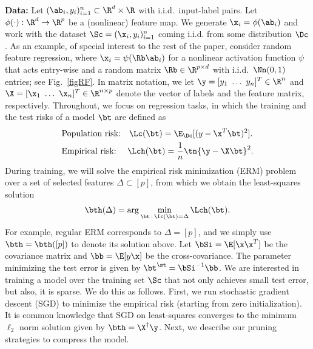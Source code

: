 \vp
\noindent \textbf{Data:} Let $(\ab_i,y_i)_{i=1}^n\subset \R^d\times \R$ with i.i.d.~input-label pairs. Let $\phi(\cdot):\R^d\rightarrow\R^p$ be a (nonlinear) feature map. We generate $\x_i=\phi(\ab_i)$ and work with the dataset $\Sc=(\x_i,y_i)_{i=1}^n$ coming i.i.d. from some distribution $\Dc$. As an example, of special interest to the rest of the paper, consider random feature regression, where $\x_i=\psi(\Rb\ab_i)$ for a nonlinear activation function $\psi$ that acts entry-wise and a random matrix $\Rb\in \R^{p\times d}$ with i.i.d.~$\Nn(0,1)$ entries; see Fig.~\ref{figRF}. In matrix notation, we let $\y=[y_1~\dots~y_n]^T\in\R^n$ and $\X=[\x_1~\dots~\x_n]^T\in\R^{n\times p}$ denote the vector of labels and the feature matrix, respectively.
Throughout, we focus on regression tasks, in which the training and the test risks of a model $\bt$ are defined as%
\begin{align}
&\text{Population risk:}~~~\Lc(\bt)=\E_{\Dc}[(y-\x^T\bt)^2].\label{test formula}\\
&\text{Empirical risk:}~~~~\Lch(\bt)=\frac{1}{n}\tn{\y-\X\bt}^2.\label{erm}
\end{align}
During training, we will solve the empirical risk minimization (ERM) problem over a set of selected features $\Delta\subset[p]$, from which we obtain the least-squares solution
\begin{align}
\label{eq:ERM}
\bth(\Delta)=\arg\min_{\bt\,:\,\Ic(\bt)=\Delta} \Lch(\bt).
\end{align}
For example, regular ERM corresponds to $\Delta=[p]$, and we simply use $\bth=\bth([p])$ to denote its solution above. Let $\bSi=\E[\x\x^T]$ be the covariance matrix and $\bb=\E[y\x]$ be the cross-covariance. The parameter minimizing the test error is given by $\bt^\st=\bSi^{-1}\bb$. We are interested in training a model over the training set $\Sc$ that not only achieves small test error, but also, it is sparse. We do this as follows. First, we run stochastic gradient descent (SGD) to minimize the empirical risk (starting from zero initialization). It is common knowledge that SGD on least-squares converges to the minimum $\ell_2$ norm solution given by $\bth=\X^\dagger \y$.  Next, we describe our pruning strategies to compress the model.

